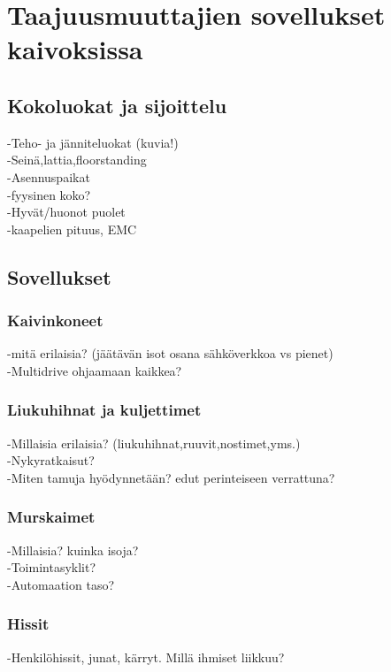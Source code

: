 \documentclass[finnish,12pt,a4paper,pdftex,elec,utf8]{aaltothesis}
\begin{document}





\clearpage


\section{Taajuusmuuttajien sovellukset kaivoksissa}

\subsection{Kokoluokat ja sijoittelu}
-Teho- ja jänniteluokat (kuvia!)\\
-Seinä,lattia,floorstanding\\
-Asennuspaikat\\
-fyysinen koko?\\
-Hyvät/huonot puolet\\
-kaapelien pituus, EMC

\subsection{Sovellukset}
\subsubsection{Kaivinkoneet}
-mitä erilaisia? (jäätävän isot osana sähköverkkoa vs pienet)\\
-Multidrive ohjaamaan kaikkea?


\subsubsection{Liukuhihnat ja kuljettimet}
-Millaisia erilaisia? (liukuhihnat,ruuvit,nostimet,yms.)\\
-Nykyratkaisut?\\
-Miten tamuja hyödynnetään? edut perinteiseen verrattuna?

\subsubsection{Murskaimet}
-Millaisia? kuinka isoja?\\
-Toimintasyklit? \cite{Hulthen}\\
-Automaation taso?

\subsubsection{Hissit}
-Henkilöhissit, junat, kärryt. Millä ihmiset liikkuu?
\end{document}
